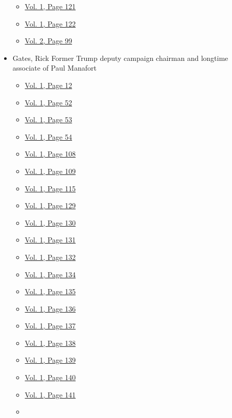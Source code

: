 \begin{itemize}
  \begin{itemize}
  \tightlist
  \item
    \protect\hyperlink{g-page-129}{Vol. 1, Page 121}
  \item
    \protect\hyperlink{g-page-130}{Vol. 1, Page 122}
  \item
    \protect\hyperlink{g-page-311}{Vol. 2, Page 99}
  \end{itemize}
\item
  Gates, Rick Former Trump deputy campaign chairman and longtime
  associate of Paul Manafort

  \begin{itemize}
  \tightlist
  \item
    \protect\hyperlink{g-page-20}{Vol. 1, Page 12}
  \item
    \protect\hyperlink{g-page-60}{Vol. 1, Page 52}
  \item
    \protect\hyperlink{g-page-61}{Vol. 1, Page 53}
  \item
    \protect\hyperlink{g-page-62}{Vol. 1, Page 54}
  \item
    \protect\hyperlink{g-page-116}{Vol. 1, Page 108}
  \item
    \protect\hyperlink{g-page-117}{Vol. 1, Page 109}
  \item
    \protect\hyperlink{g-page-123}{Vol. 1, Page 115}
  \item
    \protect\hyperlink{g-page-137}{Vol. 1, Page 129}
  \item
    \protect\hyperlink{g-page-138}{Vol. 1, Page 130}
  \item
    \protect\hyperlink{g-page-139}{Vol. 1, Page 131}
  \item
    \protect\hyperlink{g-page-140}{Vol. 1, Page 132}
  \item
    \protect\hyperlink{g-page-142}{Vol. 1, Page 134}
  \item
    \protect\hyperlink{g-page-143}{Vol. 1, Page 135}
  \item
    \protect\hyperlink{g-page-144}{Vol. 1, Page 136}
  \item
    \protect\hyperlink{g-page-145}{Vol. 1, Page 137}
  \item
    \protect\hyperlink{g-page-146}{Vol. 1, Page 138}
  \item
    \protect\hyperlink{g-page-147}{Vol. 1, Page 139}
  \item
    \protect\hyperlink{g-page-148}{Vol. 1, Page 140}
  \item
    \protect\hyperlink{g-page-149}{Vol. 1, Page 141}
  \item

\end{itemize}
\end{itemize}

